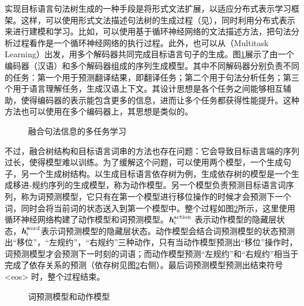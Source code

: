 \parinterval 实现目标语言句法树生成的一种手段是将形式文法扩展，以适应分布式表示学习框架。这样，可以使用形式文法描述句法树的生成过程（见{\chapterthree}），同时利用分布式表示来进行建模和学习。比如，可以使用基于循环神经网络的文法描述方法，把句法分析过程看作是一个循环神经网络的执行过程。此外，也可以从{\small\sffamily{}}（Multitask Learning）出发，用多个解码器共同完成目标语言句子的生成。图\ref{fig:15-25}展示了由一个编码器（汉语）和多个解码器组成的序列生成模型。其中不同解码器分别负责不同的任务：第一个用于预测翻译结果，即翻译任务；第二个用于句法分析任务；第三个用于语言理解任务，生成汉语上下文。其设计思想是各个任务之间能够相互辅助，使得编码器的表示能包含更多的信息，进而让多个任务都获得性能提升。这种方法也可以使用在多个编码器上，其思想是类似的。

\begin{figure}[htp]
\centering

\caption{融合句法信息的多任务学习}
\label{fig:15-25}
\end{figure}

\parinterval 不过，融合树结构和目标语言词串的方法也存在问题：它会导致目标语言端的序列过长，使得模型难以训练。为了缓解这个问题，可以使用两个模型，一个生成句子，另一个生成树结构。以生成目标语言依存树为例，生成依存树的模型是一个生成移进-规约序列的生成模型，称为动作模型。另一个模型负责预测目标语言词序列，称为词预测模型，它只有在第一个模型进行移位操作的时候才会预测下一个词，同时会将当前词的状态送入到第一个模型中。整个过程如图\ref{fig:15-26}所示，这里使用循环神经网络构建了动作模型和词预测模型。$\textbf{\em h}_i^\textrm{action}$ 表示动作模型的隐藏层状态，$\textbf{\em h}_i^\textrm{word}$表示词预测模型的隐藏层状态。动作模型会结合词预测模型的状态预测出“移位”，“左规约”，“右规约”三种动作，只有当动作模型预测出“移位”操作时，词预测模型才会预测下一时刻的词语；而动作模型预测“左规约”和“右规约”相当于完成了依存关系的预测（依存树见图\ref{fig:15-26}右侧）。最后词预测模型预测出结束符号<eos> 时，整个过程结束。

\begin{figure}[htp]
\centering

\caption{词预测模型和动作模型}
\setlength{\abovecaptionskip}{-1em}
\label{fig:15-26}
\end{figure}

